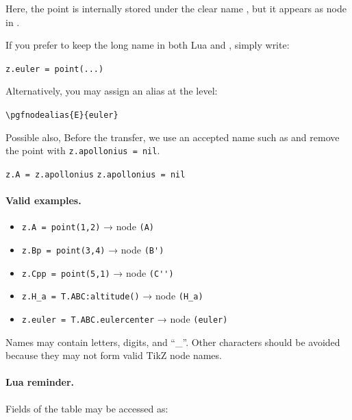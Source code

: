 Here, the point is internally stored under the clear name ,
but it appears as node  in \TIKZ.

If you prefer to keep the long name in both Lua and \TIKZ, simply write:

\begin{mybox}
\verb|z.euler = point(...)|
\end{mybox}

Alternatively, you may assign an alias at the \TIKZ{} level:

\begin{mybox}
\verb|\pgfnodealias{E}{euler}|
\end{mybox}

Possible also, Before the transfer, we use an accepted name such as  and remove the point  with \verb|z.apollonius = nil|.

\begin{mybox}
\verb|z.A = z.apollonius|
\verb|z.apollonius = nil|
\end{mybox}



\paragraph{Valid examples.}\mbox{}

\begin{mybox}
\begin{itemize}
  \item \verb|z.A = point(1,2)|     → node \verb|(A)|
  \item \verb|z.Bp = point(3,4)|     → node \verb|(B')|
  \item \verb|z.Cpp = point(5,1)|    → node \verb|(C'')|
  \item \verb|z.H_a = T.ABC:altitude()| → node \verb|(H_a)|
  \item \verb|z.euler = T.ABC.eulercenter| → node \verb|(euler)|
\end{itemize}
\end{mybox}

Names may contain letters, digits, and “\_”.
Other characters should be avoided because they may not form valid TikZ
node names.

\paragraph{Lua reminder.}

Fields of the table  may be accessed as:

